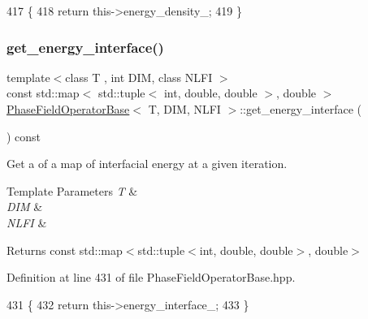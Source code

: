 \begin{DoxyCode}
417                                                                \{
418   \textcolor{keywordflow}{return} this->energy\_density\_;
419 \}
\end{DoxyCode}
\mbox{\label{classPhaseFieldOperatorBase_ac194823660f85a12d8edcf4520bbc025}} 
\subsubsection{\texorpdfstring{get\+\_\+energy\+\_\+interface()}{get\_energy\_interface()}}
{\footnotesize\ttfamily template$<$class T , int D\+IM, class N\+L\+FI $>$ \\
const std\+::map$<$ std\+::tuple$<$ int, double, double $>$, double $>$ \hyperlink{classPhaseFieldOperatorBase}{Phase\+Field\+Operator\+Base}$<$ T, D\+IM, N\+L\+FI $>$\+::get\+\_\+energy\+\_\+interface (\begin{DoxyParamCaption}{ }\end{DoxyParamCaption}) const\hspace{0.3cm}{\ttfamily [inherited]}}



Get a of a map of interfacial energy at a given iteration. 


\begin{DoxyTemplParams}{Template Parameters}
{\em T} & \\
\hline
{\em D\+IM} & \\
\hline
{\em N\+L\+FI} & \\
\hline
\end{DoxyTemplParams}
\begin{DoxyReturn}{Returns}
const std\+::map$<$std\+::tuple$<$int, double, double$>$, double$>$ 
\end{DoxyReturn}


Definition at line 431 of file Phase\+Field\+Operator\+Base.\+hpp.


\begin{DoxyCode}
431                                                                  \{
432   \textcolor{keywordflow}{return} this->energy\_interface\_;
433 \}
\end{DoxyCode}
\mbox{\label{classPhaseFieldOperatorBase_adc993d94274e82bc06f9555fbecbd310}} 
